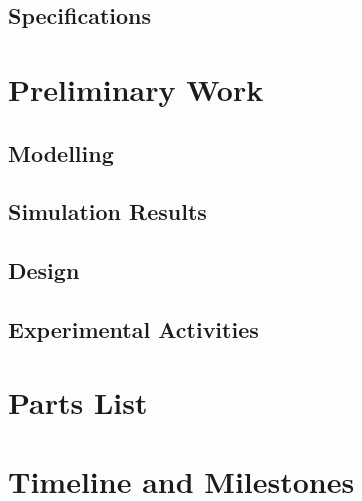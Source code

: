 \documentclass[letterpaper,12pt]{article}   %
\begin{document}
\subsection{Specifications}

\section{Preliminary Work}

\subsection{Modelling} \label{sec:model}

\subsection{Simulation Results} \label{sec:simresults}

\subsection{Design} \label{sec:design}

\subsection{Experimental Activities} \label{sec:expresults}


\section{Parts List}

\section{Timeline and Milestones} \label{sec:timeline}
\end{document}
